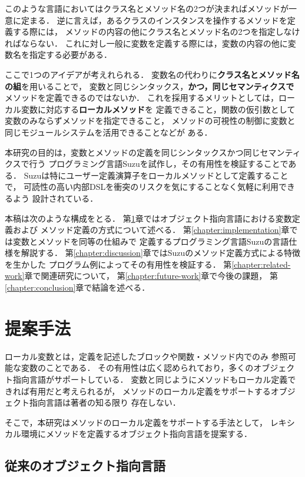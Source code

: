 \documentclass[a4paper,11pt,dvipdfmx]{jreport}
\begin{document}
このような言語においてはクラス名とメソッド名の2つが決まればメソッドが一意に定まる．
逆に言えば，あるクラスのインスタンスを操作するメソッドを定義する際には，
メソッドの内容の他にクラス名とメソッド名の2つを指定しなければならない．
これに対し一般に変数を定義する際には，変数の内容の他に変数名を指定する必要がある．

ここで1つのアイデアが考えれられる．
変数名の代わりに\textbf{クラス名とメソッド名の組}を用いることで，
変数と同じシンタックス，\textbf{かつ，同じセマンティクスで}
メソッドを定義できるのではないか．
これを採用するメリットとしては，ローカル変数に対応する\textbf{ローカルメソッド}を
定義できること，関数の仮引数として変数のみならずメソッドを指定できること，
メソッドの可視性の制御に変数と同じモジュールシステムを活用できることなどが
ある．

本研究の目的は，変数とメソッドの定義を同じシンタックスかつ同じセマンティクスで行う
プログラミング言語Suzuを試作し，その有用性を検証することである．
Suzuは特にユーザー定義演算子をローカルメソッドとして定義することで，
可読性の高い内部DSLを衝突のリスクを気にすることなく気軽に利用できるよう
設計されている．

本稿は次のような構成をとる．
第\ref{chapter:proposal}章ではオブジェクト指向言語における変数定義および
メソッド定義の方式について述べる．
第\ref{chapter:implementation}章では変数とメソッドを同等の仕組みで
定義するプログラミング言語Suzuの言語仕様を解説する．
第\ref{chapter:discussion}章ではSuzuのメソッド定義方式による特徴を生かした
プログラム例によってその有用性を検証する．
第\ref{chapter:related-work}章で関連研究について，
第\ref{chapter:future-work}章で今後の課題，
第\ref{chapter:conclusion}章で結論を述べる．


\chapter{提案手法}
\label{chapter:proposal}

ローカル変数とは，定義を記述したブロックや関数・メソッド内でのみ
参照可能な変数のことである．
その有用性は広く認められており，多くのオブジェクト指向言語がサポートしている．
変数と同じようにメソッドもローカル定義できれば有用だと考えられるが，
メソッドのローカル定義をサポートするオブジェクト指向言語は著者の知る限り
存在しない．

そこで，本研究はメソッドのローカル定義をサポートする手法として，
レキシカル環境にメソッドを定義するオブジェクト指向言語を提案する．

\section{従来のオブジェクト指向言語}
\end{document}
